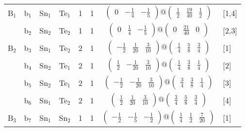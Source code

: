 \documentclass[fleqn,10pt,landscape]{article}
\begin{document}
\begin{itemize}
\begin{center}
\begin{longtable}{cc|cc|c|c|c|l}
B$_{1}$ & b$_{1}$ & Sn$_{1}$ & Te$_{1}$ & 1 & 1 & $\begin{pmatrix} 0 & - \frac{1}{4} & - \frac{1}{5} \end{pmatrix}@\begin{pmatrix} \frac{1}{2} & \frac{19}{40} & \frac{1}{2} \end{pmatrix}$ & [1,4] \\
& b$_{2}$ & Sn$_{2}$ & Te$_{2}$ & 1 & 1 & $\begin{pmatrix} 0 & \frac{1}{4} & - \frac{1}{5} \end{pmatrix}@\begin{pmatrix} 0 & \frac{21}{40} & 0 \end{pmatrix}$ & [2,3] \\ \hline
B$_{2}$ & b$_{3}$ & Sn$_{1}$ & Te$_{2}$ & 2 & 1 & $\begin{pmatrix} - \frac{1}{2} & \frac{1}{20} & \frac{3}{10} \end{pmatrix}@\begin{pmatrix} \frac{1}{4} & \frac{5}{8} & \frac{3}{4} \end{pmatrix}$ & [1] \\
& b$_{4}$ & Sn$_{2}$ & Te$_{1}$ & 2 & 1 & $\begin{pmatrix} \frac{1}{2} & - \frac{1}{20} & \frac{3}{10} \end{pmatrix}@\begin{pmatrix} \frac{1}{4} & \frac{3}{8} & \frac{1}{4} \end{pmatrix}$ & [2] \\
& b$_{5}$ & Sn$_{2}$ & Te$_{1}$ & 2 & 1 & $\begin{pmatrix} - \frac{1}{2} & - \frac{1}{20} & \frac{3}{10} \end{pmatrix}@\begin{pmatrix} \frac{3}{4} & \frac{3}{8} & \frac{1}{4} \end{pmatrix}$ & [3] \\
& b$_{6}$ & Sn$_{1}$ & Te$_{2}$ & 2 & 1 & $\begin{pmatrix} \frac{1}{2} & \frac{1}{20} & \frac{3}{10} \end{pmatrix}@\begin{pmatrix} \frac{3}{4} & \frac{5}{8} & \frac{3}{4} \end{pmatrix}$ & [4] \\ \hline
B$_{3}$ & b$_{7}$ & Sn$_{1}$ & Sn$_{2}$ & 1 & 1 & $\begin{pmatrix} - \frac{1}{2} & - \frac{1}{5} & - \frac{1}{2} \end{pmatrix}@\begin{pmatrix} \frac{1}{4} & \frac{1}{2} & \frac{7}{20} \end{pmatrix}$ & [1] \\

\end{longtable}
\end{center}
\end{itemize}
\end{document}
